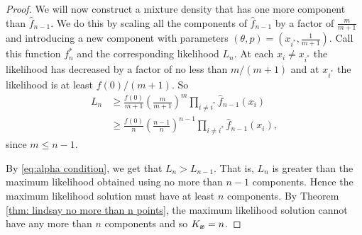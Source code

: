 \begin{proof}
			We will now construct a mixture density that has one more component than $\hat{f}_{n-1}$. We do this by scaling all the components of $\hat{f}_{n-1}$ by a factor of $\frac{m}{m+1}$ and introducing a new component with parameters $(\theta, p) = (x_{i^*},\frac{1}{m+1})$. Call this function $f^*_n$ and the corresponding likelihood $L_n$. At each $x_i \neq x_{i^*}$ the likelihood has decreased by a factor of no less than $m/(m+1)$ and at $x_{i^*}$ the likelihood is at least $f(0)/(m+1)$. So
			\begin{align}
				L_n &\geq \frac{f(0)}{m+1} \left(\frac{m}{m+1}\right)^{m}\prod_{i\neq i^*} \hat{f}_{n-1}(x_i) \\
				&\geq \frac{f(0)}{n} \left(\frac{n-1}{n}\right)^{n-1}\prod_{i\neq i^*} \hat{f}_{n-1}(x_i),
			\end{align}
			since $m \leq n-1$.
			
			By \eqref{eq:alpha condition}, we get that $L_n > L_{n-1}$. That is, $L_n$ is greater than the maximum likelihood obtained using no more than $n-1$ components. Hence the maximum likelihood solution must have at least $n$ components. By Theorem \ref{thm: lindsay no more than n points}, the maximum likelihood solution cannot have any more than $n$ components and so $K_{\bm{{x}}} = n$.
		\end{proof}

		
